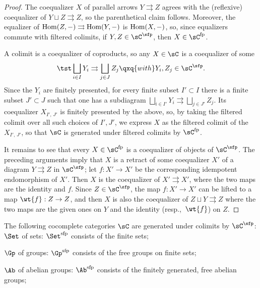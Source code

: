 \begin{proof}
The coequalizer $X$ of parallel arrows $Y\rightrightarrows Z$ agrees with the (reflexive) coequalizer of $Y\sqcup Z\rightrightarrows Z$, so the parenthetical claim follows. %
Moreover, the equalizer of $\operatorname{Hom}(Z,-)\rightrightarrows \operatorname{Hom}(Y,-)$ is $\operatorname{Hom}(X,-)$, so, since equalizers commute with filtered colimits, if $Y, Z \in \sC^\sfp$, then	 $X\in \sC^{\mathrm{fp}}$.

A colimit is a coequalizer of coproducts, so any $X\in \sC$ is a coequalizer of some
\[
\tst \bigsqcup_{i\in I} Y_i\rightrightarrows \bigsqcup_{j\in J} Z_j \qxq{with} Y_i,Z_j\in \sC^\sfp.
\]
Since the $Y_i$ are finitely presented, for every finite subset $I'\subset I$ there is a finite subset $J'\subset J$ such that one has a subdiagram $\bigsqcup_{i\in I'} Y_i\rightrightarrows \bigsqcup_{j\in J'} Z_j$. Its coequalizer $X_{I',\,J'}$ is finitely presented by the above, so, by taking the filtered colimit over all such choices of $I', J'$, we express $X$ as the filtered colimit of the $X_{I',\, J'}$, so that $\sC$ is generated under filtered colimits by $\sC^{\mathrm{fp}}$.

It remains to see that every $X\in \sC^{\mathrm{fp}}$ is a coequalizer of objects of $\sC^\sfp$. The preceding arguments imply that $X$ is a retract of some coequalizer $X'$ of a diagram $Y\rightrightarrows Z$ in $\sC^\sfp$; let $f: X'\to X'$ be the corresponding idempotent endomorphism of $X'$. Then $X$ is the coequalizer of $X'\rightrightarrows X'$, where the two maps are the identity and $f$. Since $Z\in \sC^\sfp$, the map $f: X'\to X'$ can be lifted to a map $\wt{f}: Z\to Z$, and then $X$ is also the coequalizer of $Z\sqcup Y\rightrightarrows Z$ where the two maps are the given ones on $Y$ and the identity (resp.,~$\wt{f}$) on $Z$.
\end{proof}



\beg \label{sfp-egs}
The following cocomplete categories $\sC$ are generated under colimits by $\sC^\sfp$: %
\benuma
\m \label{sfp-egs-Set}
$\Set$ of sets: $\Set^{\mathrm{sfp}}$ consists of the finite sets;

\m
$\Gp$ of groups: $\Gp^{\mathrm{sfp}}$ consists of the free groups on finite sets;

\m
$\Ab$ of abelian groups: $\Ab^{\mathrm{sfp}}$ consists of the finitely generated, free abelian groups;

